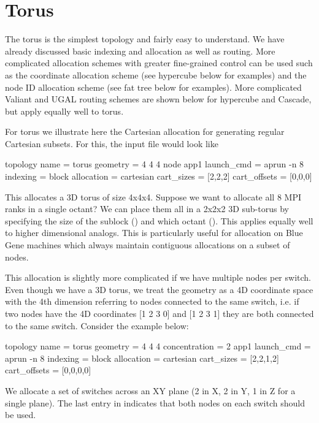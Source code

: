 \section{Torus}
\label{subsec:tutorial:hypercube}

The torus is the simplest topology and fairly easy to understand.
We have already discussed basic indexing and allocation as well as routing.
More complicated allocation schemes with greater fine-grained control can be used such as the
coordinate allocation scheme (see hypercube below for examples) and the node ID allocation scheme (see fat tree below for examples).
More complicated Valiant and UGAL routing schemes are shown below for hypercube and Cascade,
but apply equally well to torus.

For torus we illustrate here the Cartesian allocation for generating regular Cartesian subsets.
For this, the input file would look like 

\begin{ViFile}
topology {
 name = torus
 geometry = 4 4 4
}
node {
 app1 {
  launch_cmd = aprun -n 8
  indexing = block
  allocation = cartesian
  cart_sizes = [2,2,2]
  cart_offsets = [0,0,0]
 }
}
\end{ViFile}

This allocates a 3D torus of size 4x4x4.
Suppose we want to allocate all 8 MPI ranks in a single octant?
We can place them all in a 2x2x2 3D sub-torus by specifying the size of the sublock 
() and which octant ().
This applies equally well to higher dimensional analogs.
This is particularly useful for allocation on Blue Gene machines
which always maintain contiguous allocations on a subset of nodes.

This allocation is slightly more complicated if we have multiple nodes per switch.
Even though we have a 3D torus, 
we treat the geometry as a 4D coordinate space with the 4th dimension referring to nodes connected to the same switch, 
i.e. if two nodes have the 4D coordinates [1 2 3 0] and [1 2 3 1] they are both connected to the same switch.
Consider the example below:

\begin{ViFile}
topology {
 name = torus
 geometry = 4 4 4
 concentration = 2
}
app1 {
 launch_cmd = aprun -n 8
 indexing = block
 allocation = cartesian
 cart_sizes = [2,2,1,2]
 cart_offsets = [0,0,0,0]
}
\end{ViFile}

We allocate a set of switches across an XY plane (2 in X, 2 in Y, 1 in Z for a single plane).
The last entry in  indicates that both nodes on each switch should be used.


